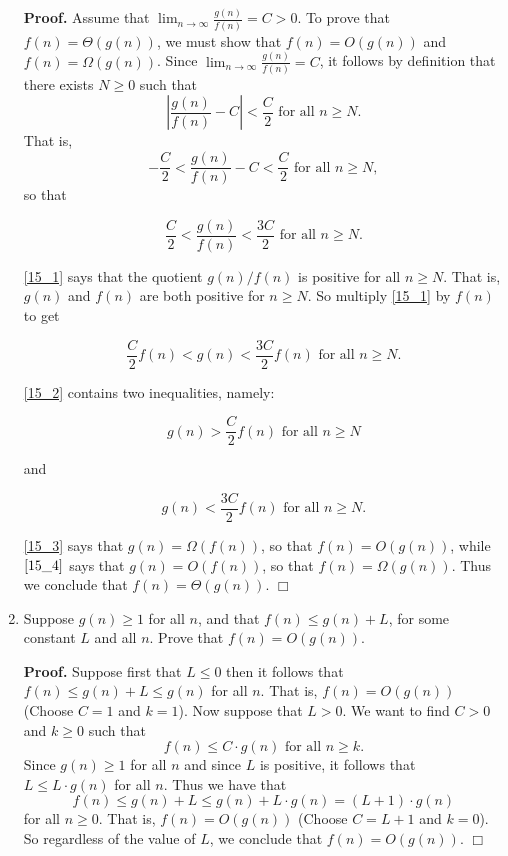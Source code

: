 \documentclass[9pt]{article}
\newcommand{\qed}{\hfill \ensuremath{\Box}}
\begin{document}
\begin{enumerate}
      \textbf{Proof.} Assume that
      $\lim_{n\rightarrow\infty}\frac{g(n)}{f(n)} = C > 0$. To prove that
      $f(n) = \Theta(g(n))$, we must show that $f(n) = O(g(n))$ and
      $f(n) = \Omega(g(n))$. Since
      $\lim_{n\rightarrow\infty}\frac{g(n)}{f(n)} = C$, it follows by definition
      that there exists $N \ge 0$ such that
      $$\left|\frac{g(n)}{f(n)} - C\right| < \frac{C}{2} \text{ for all }
         n \ge N.$$
      That is,
      $$-\frac{C}{2} < \frac{g(n)}{f(n)} - C < \frac{C}{2} \text{ for all }
         n \ge N,$$
      so that

      \begin{equation} \label{15_1}
         \frac{C}{2} < \frac{g(n)}{f(n)} < \frac{3C}{2} \text{ for all }n \ge N.
      \end{equation}

      \eqref{15_1} says that the quotient $g(n)/f(n)$ is positive for all
      $n \ge N$. That is, $g(n)$ and $f(n)$ are both positive for $n \ge N$. So
      multiply \eqref{15_1} by $f(n)$ to get

      \begin{equation} \label{15_2}
         \frac{C}{2} f(n) < g(n) < \frac{3C}{2}f(n) \text{ for all } n \ge N.
      \end{equation}

      \eqref{15_2} contains two inequalities, namely:

      \begin{equation} \label{15_3}
         g(n) > \frac{C}{2} f(n) \text{ for all } n \ge N
      \end{equation}

      and

      \begin{equation} \label{15_4}
         g(n) < \frac{3C}{2}f(n) \text{ for all } n \ge N.
      \end{equation}

      \eqref{15_3} says that $g(n) = \Omega(f(n))$, so that $f(n) = O(g(n))$,
      while $\eqref{15_4}$ says that $g(n) = O(f(n))$, so that
      $f(n) = \Omega(g(n))$. Thus we conclude that $f(n) = \Theta(g(n))$. \qed
   \item Suppose $g(n) \ge 1$ for all $n$, and that $f(n) \le g(n) + L$, for
         some constant $L$ and all $n$. Prove that $f(n) = O(g(n))$.

      \textbf{Proof.} Suppose first that $L \le 0$ then it follows that
      $f(n) \le g(n) + L \le g(n)$ for all $n$. That is, $f(n) = O(g(n))$
      (Choose $C = 1$ and $k = 1$). Now suppose that $L > 0$. We want to find
      $C > 0$ and $k \ge 0$ such that
      $$f(n) \le C \cdot g(n) \text{ for all } n \ge k.$$
      Since $g(n) \ge 1$ for all $n$ and since $L$ is positive, it follows
      that $L \le L \cdot g(n)$ for all $n$. Thus we have that
      $$f(n) \le g(n) + L \le g(n) + L \cdot g(n) = (L+1) \cdot g(n)$$
      for all $n \ge 0$. That is, $f(n) = O(g(n))$ (Choose $C = L + 1$ and
      $k = 0$). So regardless of the value of $L$, we conclude that
      $f(n) = O(g(n))$. \qed


\end{enumerate}
\end{document}
